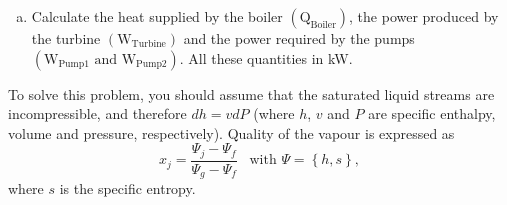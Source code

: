 \documentclass[calculator,steamtables,refrigeranttables,psychrometricchart,datasheet,solutions,resit]{exam}
\newcommand{\frc}{\displaystyle\frac}
\begin{document}
\begin{question}
\begin{enumerate}[(a)]
\item Calculate the heat supplied by the boiler $\left(\text{Q}_{\text{Boiler}}\right)$, the power produced by the turbine $\left(\text{W}_{\text{Turbine}}\right)$ and the power required by the pumps $\left(\text{W}_{\text{Pump1}}\text{ and W}_{\text{Pump2}}\right)$. All these quantities in kW.~
\end{enumerate}

To solve this problem, you should assume that the saturated liquid streams are incompressible, and therefore $dh = vdP$ (where $h$, $v$ and $P$ are specific enthalpy, volume and pressure, respectively). Quality of the vapour is expressed as
\begin{displaymath}
x_{j} = \frc{\Psi_{j}-\Psi_{f}}{\Psi_{g}-\Psi_{f}}\;\;\;\text{with }\Psi=\left\{h,s\right\},
\end{displaymath}
where $s$ is the specific entropy.

\end{question}

\clearpage
\end{document}
